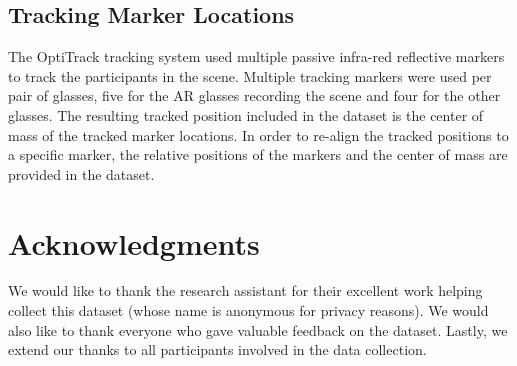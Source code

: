 \documentclass[journal]{IEEEtran}
\begin{document}
\subsection{Tracking Marker Locations}
The OptiTrack tracking system used multiple passive infra-red reflective markers to track the participants in the scene.
Multiple tracking markers were used per pair of glasses, five for the AR glasses recording the scene and four for the other glasses.
The resulting tracked position included in the dataset is the center of mass of the tracked marker locations.
In order to re-align the tracked positions to a specific marker, the relative positions of the markers and the center of mass are provided in the dataset.

 

\section*{Acknowledgments} \label{sec:Acknowledgments}

We would like to thank the research assistant for their excellent work helping collect this dataset (whose name is anonymous for privacy reasons).
We would also like to thank everyone who gave valuable feedback on the dataset.
Lastly, we extend our thanks to all participants involved in the data collection.

 

\renewcommand*{\bibfont}{\footnotesize}
\setlength\bibitemsep{0.2em}
\printbibliography
\end{document}
